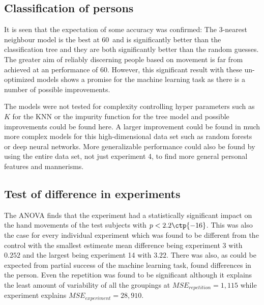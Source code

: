 \documentclass[11pt,fleqn]{article}
\begin{document}
\subsection{Classification of persons}
It is seen that the expectation of some accuracy was confirmed: The 3-nearest neighbour model is the best at 60\pro\ and is significantly better than the classification tree and they are both significantly better than the random guesses. The greater aim of reliably discerning people based on movement is far from achieved at an performance of 60\pro. However, this significant result with these un-optimized models shows a promise for the machine learning task as there is a number of possible improvements. 



The models were not tested for complexity controlling hyper parameters such as \(K\) for the KNN or the impurity function for the tree model and possible improvements could be found here. A larger improvement could be found in much more complex models for this high-dimensional data set such as random forests or deep neural networks. More generalizable performance could also be found by using the entire data set, not just experiment 4, to find more general personal  features and mannerisms.

\subsection{Test of difference in experiments}
The ANOVA finds that the experiment had a statistically significant impact on the hand movements of the test subjects with $ p<2.2\ctp{-16} $.
This was also the case for every individual experiment which was found to be different from the control with the smallest estimeate mean difference being experiment 3 with \(0.252\) and the largest being experiment 14 with \(3.22\).
There was also, as could be expected from partial success of the machine learning task, found differences in the person. Even the repetition was found to be significant although it explains the least amount of variability of all the groupings at \(MSE_{repetition}=1,115\) while experiment explains \(MSE_{experiment}=28,910\).
\end{document}
